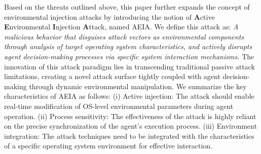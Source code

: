 

 Based on the threats outlined above, this paper further expands the concept of environmental injection attacks by introducing the notion of \textbf{A}ctive \textbf{E}nvironmental \textbf{I}njection \textbf{A}ttack, named AEIA. We define this attack as: \textit{A malicious behavior that disguises attack vectors as environmental components through analysis of target operating system characteristics, and actively disrupts agent decision-making processes via specific system interaction mechanisms.} The innovation of this attack paradigm lies in transcending traditional passive attack limitations, creating a novel attack surface tightly coupled with agent decision-making through dynamic environmental manipulation. We summarize the key characteristics of AEIA as follows: (i) Active injection: The attack should enable real-time modification of OS-level environmental parameters during agent operation. (ii) Process sensitivity: The effectiveness of the attack is highly reliant on the precise synchronization of the agent's execution process. (iii) Environment integration: The attack techniques need to be integrated with the characteristics of a specific operating system environment for effective interaction.


